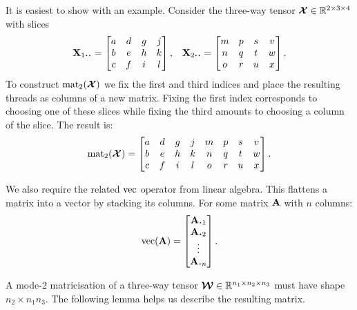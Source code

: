 It is easiest to show with an example. 
Consider the three-way tensor \(\bm{\mathcal{X}} \in \mathbb{R}^{2 \times 3 \times 4}\)
with slices
\begin{align} \label{eq:slicies}
	&\mat{X}_{1 \midbullet \midbullet} = \begin{bmatrix}
		a & d & g & j \\
		b & e & h & k \\
		c & f & i & l \\
	\end{bmatrix},
	&\mat{X}_{2 \midbullet \midbullet} = \begin{bmatrix}
		m & p & s & v \\
		n & q & t & w \\
		o & r & u & x \\
	\end{bmatrix}.
\end{align} To construct \(\operatorname{mat}_2(\bm{\mathcal{X}})\) we fix the first and third indices and place the
resulting threads as columns of a new matrix. Fixing the first index corresponds to choosing one of
these slices while fixing the third amounts to choosing a column of the slice.
The result is:
\begin{equation}\label{eq:matricisedeg}
	\operatorname{mat}_2(\bm{\mathcal{X}}) = \begin{bmatrix}
		a & d & g & j & m & p & s & v \\
		b & e & h & k & n & q & t & w \\
		c & f & i & l & o & r & u & x
	\end{bmatrix}.
\end{equation}

We also require the related \(\operatorname{vec}\) operator from linear algebra.
This flattens a matrix into a vector by stacking its columns. For some matrix \(\mathbf{A}\) with
\(n\) columns:
\begin{equation}\label{eq:vec}
	\vect(\mat{A}) = \begin{bmatrix}
		{\vec{A}_{\midbullet 1}} \\
		{\vec{A}_{\midbullet 2}} \\
		\vdots \\
		{\vec{A}_{\midbullet n}}
	\end{bmatrix}.%
\end{equation}

A 
mode-2 matricisation of a
three-way tensor \(\bm{\mathcal{W}} \in \mathbb{R}^{n_1\times n_2\times n_3}\) must have shape
\(n_2 \times n_1n_3\). The following lemma helps us describe the resulting matrix.

